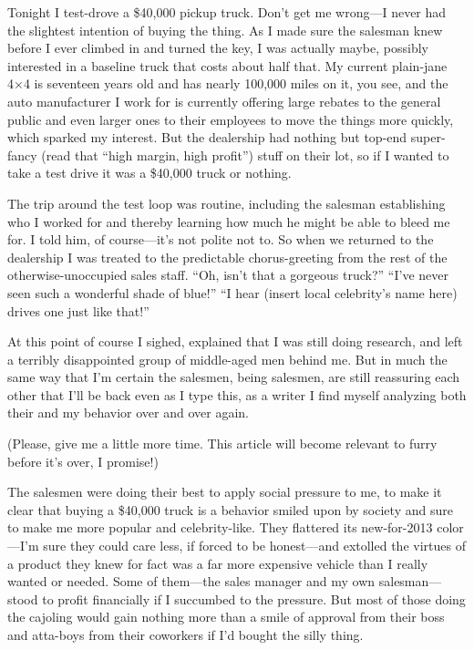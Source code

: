 
Tonight I test-drove a \$40,000 pickup truck. Don't get me wrong—I never had the slightest intention of buying the thing. As I made sure the salesman knew before I ever climbed in and turned the key, I was actually maybe, possibly interested in a baseline truck that costs about half that. My current plain-jane 4×4 is seventeen years old and has nearly 100,000 miles on it, you see, and the auto manufacturer I work for is currently offering large rebates to the general public and even larger ones to their employees to move the things more quickly, which sparked my interest. But the dealership had nothing but top-end super-fancy (read that ``high margin, high profit'') stuff on their lot, so if I wanted to take a test drive it was a \$40,000 truck or nothing.

The trip around the test loop was routine, including the salesman establishing who I worked for and thereby learning how much he might be able to bleed me for. I told him, of course—it's not polite not to. So when we returned to the dealership I was treated to the predictable chorus-greeting from the rest of the otherwise-unoccupied sales staff. ``Oh, isn't that a gorgeous truck?'' ``I've never seen such a wonderful shade of blue!'' ``I hear (insert local celebrity's name here) drives one just like that!''

At this point of course I sighed, explained that I was still doing research, and left a terribly disappointed group of middle-aged men behind me. But in much the same way that I'm certain the salesmen, being salesmen, are still reassuring each other that I'll be back even as I type this, as a writer I find myself analyzing both their and my behavior over and over again.

(Please, give me a little more time. This article will become relevant to furry before it's over, I promise!)

The salesmen were doing their best to apply social pressure to me, to make it clear that buying a \$40,000 truck is a behavior smiled upon by society and sure to make me more popular and celebrity-like. They flattered its new-for-2013 color—I'm sure they could care less, if forced to be honest—and extolled the virtues of a product they knew for fact was a far more expensive vehicle than I really wanted or needed. Some of them—the sales manager and my own salesman—stood to profit financially if I succumbed to the pressure. But most of those doing the cajoling would gain nothing more than a smile of approval from their boss and atta-boys from their coworkers if I'd bought the silly thing.

